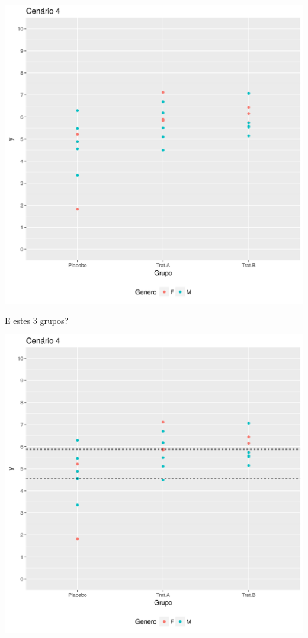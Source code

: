 \documentclass{beamer}
\begin{document}
\begin{frame}
  \begin{center}
    \includegraphics[height=.9\textheight]{Cap13-30/cenario22}
  \end{center}
\end{frame}

\begin{frame}{E estes 3 grupos?}
  \begin{center}
    \includegraphics[height=.9\textheight]{Cap13-30/cenario22_medias}

  \end{center}
\end{frame}
\end{document}

